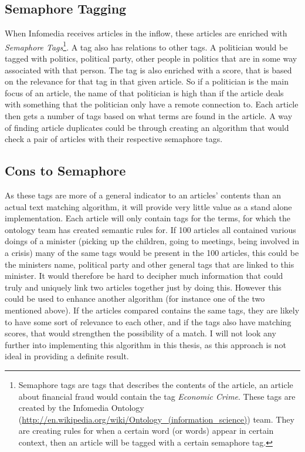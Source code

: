 \subsection{Semaphore Tagging}
When Infomedia receives articles in the inflow, these articles are enriched with \textit{Semaphore Tags}\footnote{Semaphore tags are tags that describes the contents of the article, an article about financial fraud would contain the tag \textit{Economic Crime}. These tags are created by the Infomedia Ontology (\url{http://en.wikipedia.org/wiki/Ontology_(information_science)}) team. They are creating rules for when a certain word (or words) appear in certain context, then an article will be tagged with a certain semaphore tag.}. A tag also has relations to other tags. A politician would be tagged with politics, political party, other people in politics that are in some way associated with that person. The tag is also enriched with a score, that is based on the relevance for that tag in that given article. So if a politician is the main focus of an article, the name of that politician is high than if the article deals with something that the politician only have a remote connection to. Each article then gets a number of tags based on what terms are found in the article. A way of finding article duplicates could be through creating an algorithm that would check a pair of articles with their respective semaphore tags.

\subsection{Cons to Semaphore}
As these tags are more of a general indicator to an articles' contents than an actual text matching algorithm, it will provide very little value as a stand alone implementation. Each article will only contain tags for the terms, for which the ontology team has created semantic rules for. If 100 articles all contained various doings of a minister (picking up the children, going to meetings, being involved in a crisis) many of the same tags would be present in the 100 articles, this could be the ministers name, political party and other general tags that are linked to this minister. It would therefore be hard to decipher much information that could truly and uniquely link two articles together just by doing this. However this could be used to enhance another algorithm (for instance one of the two mentioned above). If the articles compared contains the same tags, they are likely to have some sort of relevance to each other, and if the tags also have matching scores, that would strengthen the possibility of a match. I will not look any further into implementing this algorithm in this thesis, as this approach is not ideal in providing a definite result.

